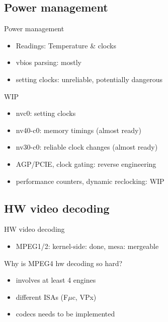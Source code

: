 \documentclass[11pt,english,compress]{beamer}
\begin{document}
	\subsection{Power management}
		\begin{frame}
			\begin{block}{Power management}
 				\begin{itemize}
					\item Readings: Temperature \& clocks
					\item vbios parsing: mostly
					\item setting clocks: unreliable, potentially dangerous
				\end{itemize}
			\end{block}

			\begin{block}{WIP}
				\begin{itemize}
					\item nvc0: setting clocks
					\item nv40-c0: memory timings (almost ready)
					\item nv30-c0: reliable clock changes (almost ready)
					\item AGP/PCIE, clock gating: reverse engineering
					\item performance counters, dynamic reclocking: WIP
				\end{itemize}
			\end{block}
		\end{frame}

	\subsection{HW video decoding}
		\begin{frame}
			\begin{block}{HW video decoding}
				\begin{itemize}
					\item MPEG1/2: kernel-side: done, mesa: mergeable
				\end{itemize}
			\end{block}

			\begin{block}{Why is MPEG4 hw decoding so hard?}
				\begin{itemize}
					\item involves at least 4 engines
					\item different ISAs (F$\mu$c, VPx)
					\item codecs needs to be implemented
				\end{itemize}
			\end{block}
		\end{frame}
\end{document}
